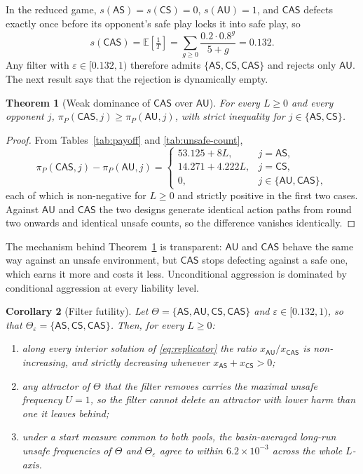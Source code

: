 \documentclass[11pt,a4paper]{article}
\newtheorem{theorem}{Theorem}
\newtheorem{corollary}[theorem]{Corollary}
\theoremstyle{definition}
\newcommand{\AS}{\textsf{AS}}
\newcommand{\AU}{\textsf{AU}}
\newcommand{\CS}{\textsf{CS}}
\newcommand{\CAS}{\textsf{CAS}}
\newcommand{\piP}{\pi_{P}}
\begin{document}
In the reduced game, $s(\AS)=s(\CS)=0$, $s(\AU)=1$, and $\CAS$ defects exactly
once before its opponent's safe play locks it into safe play, so
\begin{equation}
s(\CAS)=\mathbb{E}\!\left[\tfrac{1}{T}\right]
=\sum_{g\ge 0}\frac{0.2\cdot 0.8^{g}}{5+g}=0.132 .
\label{eq:solo}
\end{equation}
Any filter with $\varepsilon\in[0.132,1)$ therefore admits $\{\AS,\CS,\CAS\}$
and rejects only $\AU$. The next result says that the rejection is
dynamically empty.

\begin{theorem}[Weak dominance of $\CAS$ over $\AU$]\label{thm:dominance}
For every $L\ge 0$ and every opponent $j$, $\piP(\CAS,j)\ge\piP(\AU,j)$, with
strict inequality for $j\in\{\AS,\CS\}$.
\end{theorem}

\begin{proof}
From Tables~\ref{tab:payoff} and \ref{tab:unsafe-count},
\begin{equation}
\piP(\CAS,j)-\piP(\AU,j)=
\begin{cases}
53.125+8L, & j=\AS,\\
14.271+4.222L, & j=\CS,\\
0, & j\in\{\AU,\CAS\},
\end{cases}
\label{eq:dominance}
\end{equation}
each of which is non-negative for $L\ge0$ and strictly positive in the first
two cases. Against $\AU$ and $\CAS$ the two designs generate identical action
paths from round two onwards and identical unsafe counts, so the difference
vanishes identically.
\end{proof}

The mechanism behind Theorem~\ref{thm:dominance} is transparent: $\AU$ and
$\CAS$ behave the same way against an unsafe environment, but $\CAS$ stops
defecting against a safe one, which earns it more and costs it less.
Unconditional aggression is dominated by conditional aggression at every
liability level.

\begin{corollary}[Filter futility]\label{cor:filter}
Let $\Theta=\{\AS,\AU,\CS,\CAS\}$ and $\varepsilon\in[0.132,1)$, so that
$\Theta_{\varepsilon}=\{\AS,\CS,\CAS\}$. Then, for every $L\ge 0$:
\begin{enumerate}
\item[(i)] along every interior solution of \eqref{eq:replicator} the ratio
$x_{\AU}/x_{\CAS}$ is non-increasing, and strictly decreasing whenever
$x_{\AS}+x_{\CS}>0$;
\item[(ii)] any attractor of $\Theta$ that the filter removes carries the
maximal unsafe frequency $U=1$, so the filter cannot delete an attractor with
lower harm than one it leaves behind;
\item[(iii)] under a start measure common to both pools, the basin-averaged
long-run unsafe frequencies of $\Theta$ and $\Theta_{\varepsilon}$ agree to
within $6.2\times10^{-3}$ across the whole $L$-axis.
\end{enumerate}
\end{corollary}
\end{document}
